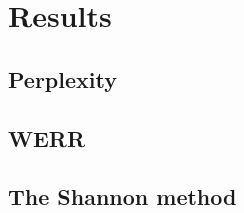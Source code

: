 \chapter{Results}
\label{chapter:results}
\section{Perplexity}
\section{WERR}
\section{The Shannon method}
